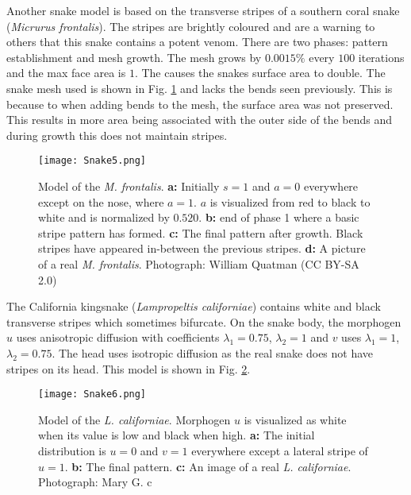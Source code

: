 \newpage
Another snake model is based on the transverse stripes of a southern coral snake (\textit{Micrurus frontalis}). The stripes are brightly coloured and are a warning to others that this snake contains a potent venom. There are two phases: pattern establishment and mesh growth. The mesh grows by $0.0015\%$ every $100$ iterations and the max face area is $1$. The causes the snakes surface area to double. The snake mesh used is shown in Fig. \ref{fig:Snake5} and lacks the bends seen previously. This is because to when adding bends to the mesh, the surface area was not preserved. This results in more area being associated with the outer side of the bends and during growth this does not maintain stripes.

\begin{figure}[ht]
	\centering
	\texttt{[image: Snake5.png]}
	\caption{Model of the \textit{M. frontalis}. \textbf{a:} Initially $s=1$ and $a=0$ everywhere except on the nose, where $a=1$. $a$ is visualized from red to black to white and is normalized by $0.520$. \textbf{b:} end of phase 1 where a basic stripe pattern has formed. \textbf{c:} The final pattern after growth. Black stripes have appeared in-between the previous stripes. \textbf{d:} A picture of a real \textit{M. frontalis}. \textcolor{citation-gray}{Photograph: William Quatman (CC BY-SA 2.0)}}
	\label{fig:Snake5}
\end{figure}

\newpage 

The California kingsnake (\textit{Lampropeltis californiae}) contains white and black transverse stripes which sometimes bifurcate. On the snake body, the morphogen $u$ uses  anisotropic diffusion with coefficients $\lambda_{1}=0.75$, $\lambda_{2}=1$ and $v$ uses $\lambda_{1}=1$, $\lambda_{2}=0.75$. The head uses isotropic diffusion as the real snake does not have stripes on its head. This model is shown in Fig. \ref{fig:Snake6}.

\begin{figure}[ht]
	\centering
	\texttt{[image: Snake6.png]}
	\caption{Model of the \textit{L. californiae}. Morphogen $u$ is visualized as white when its value is low and black when high. \textbf{a:} The initial distribution is $u=0$ and $v=1$ everywhere except a lateral stripe  of $u=1$. \textbf{b:} The final pattern. \textbf{c:} An image of a real \textit{L. californiae}. \textcolor{citation-gray}{Photograph: Mary G. \textcircled{c}}} %
	\label{fig:Snake6}
\end{figure}

